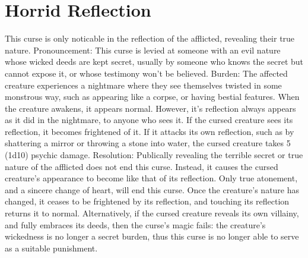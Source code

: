 \documentclass[10pt,a4paper,twoside,twocolumn,openany,bg=print,nodeprecatedcode]{dndbook}
\begin{document}
\section{Horrid Reflection}
This curse is only noticable in the reflection of the afflicted, revealing their true nature.
Pronouncement: This curse is levied at someone with an evil nature whose wicked deeds are kept secret, usually by someone who knows the secret but cannot expose it, or whose testimony won't be believed.
Burden: The affected creature experiences a nightmare where they see themselves twisted in some monstrous way, such as appearing like a corpse, or having bestial features. When the creature awakens, it appears normal. However, it's reflection always appears as it did in the nightmare, to anyone who sees it. If the cursed creature sees its reflection, it becomes frightened of it. If it attacks its own reflection, such as by shattering a mirror or throwing a stone into water, the cursed creature takes 5 (1d10) psychic damage.
Resolution: Publically revealing the terrible secret or true nature of the afflicted does not end this curse. Instead, it causes the cursed creature's appearance to become like that of its reflection. Only true atonement, and a sincere change of heart, will end this curse. Once the creature's nature has changed, it ceases to be frightened by its reflection, and touching its reflection returns it to normal.
Alternatively, if the cursed creature reveals its own villainy, and fully embraces its deeds, then the curse's magic fails: the creature's wickedness is no longer a secret burden, thus this curse is no longer able to serve as a suitable punishment.
\end{document}
